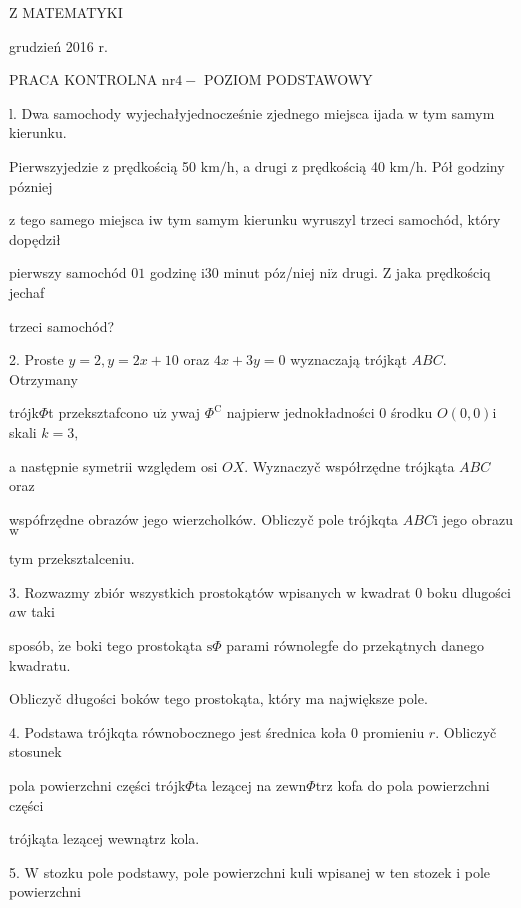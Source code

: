 \documentclass[a4paper,12pt]{article}
\begin{document}
Z MATEMATYKI

grudzień 2016 r.

PRACA KONTROLNA $\mathrm{n}\mathrm{r} 4-$ POZIOM PODSTAWOWY

l. Dwa samochody wyjechałyjednocześnie zjednego miejsca ijada $\mathrm{w}$ tym samym kierunku.

Pierwszyjedzie $\mathrm{z}$ prędkością 50 $\mathrm{k}\mathrm{m}/\mathrm{h}$, a drugi $\mathrm{z}$ prędkością 40 $\mathrm{k}\mathrm{m}/\mathrm{h}$. Pół godziny póz$\acute{}$niej

$\mathrm{z}$ tego samego miejsca $\mathrm{i}\mathrm{w}$ tym samym kierunku wyruszyl trzeci samochód, który dopędził

pierwszy samochód $0 1$ godzinę $\mathrm{i}30$ minut póz/niej $\mathrm{n}\mathrm{i}\dot{\mathrm{z}}$ drugi. $\mathrm{Z}$ jaka prędkościq jechaf

trzeci samochód?

2. Proste $y = 2, y = 2x+10$ oraz $4x+3y = 0$ wyznaczają trójkąt $ABC$. Otrzymany

trójk$\Phi$t przeksztafcono $\mathrm{u}\dot{\mathrm{z}}$ ywaj $\Phi^{\mathrm{C}}$ najpierw jednokładności $0$ środku $O(0,0)\mathrm{i}$ skali $k=3,$

a następnie symetrii względem osi $OX$. Wyznaczyč współrzędne trójkąta $ABC$ oraz

wspófrzędne obrazów jego wierzcholków. Obliczyč pole trójkqta $ABC\mathrm{i}$ jego obrazu $\mathrm{w}$

tym przeksztalceniu.

3. Rozwazmy zbiór wszystkich prostokątów wpisanych $\mathrm{w}$ kwadrat $0$ boku dlugości $a\mathrm{w}$ taki

sposób, $\dot{\mathrm{z}}\mathrm{e}$ boki tego prostokąta $\mathrm{s}\Phi$ parami równolegfe do przekątnych danego kwadratu.

Obliczyč długości boków tego prostokąta, który ma największe pole.

4. Podstawa trójkqta równobocznego jest średnica koła $0$ promieniu $r$. Obliczyč stosunek

pola powierzchni części trójk$\Phi$ta lezącej na $\mathrm{z}\mathrm{e}\mathrm{w}\mathrm{n}\Phi \mathrm{t}\mathrm{r}\mathrm{z}$ kofa do pola powierzchni części

trójkąta lezącej wewnątrz kola.

5. $\mathrm{W}$ stozku pole podstawy, pole powierzchni kuli wpisanej $\mathrm{w}$ ten stozek $\mathrm{i}$ pole powierzchni
\end{document}
